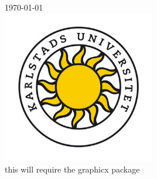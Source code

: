 \begin{titlepage}
\begin{minipage}{0.4\textwidth}
\begin{flushright}
  \end{flushright}
  \end{minipage}\\[1.5cm]



  {\large \today}\\[1.5cm] %


  \includegraphics[width=0.5\textwidth]{bilder/kau.jpg}\\[1cm] %
  this will require the graphicx package
   

   \vfill %

   \end{titlepage}

